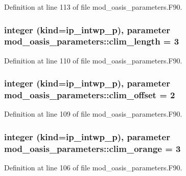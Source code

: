 Definition at line 113 of file mod\+\_\+oasis\+\_\+parameters.\+F90.

\hypertarget{classmod__oasis__parameters_a984896e821cbbb8c4a91e86ff19d54de}{
\subsubsection[{clim\+\_\+length}]{\setlength{\rightskip}{0pt plus 5cm}integer (kind=ip\+\_\+intwp\+\_\+p), parameter mod\+\_\+oasis\+\_\+parameters\+::clim\+\_\+length = 3}}\label{classmod__oasis__parameters_a984896e821cbbb8c4a91e86ff19d54de}


Definition at line 110 of file mod\+\_\+oasis\+\_\+parameters.\+F90.

\hypertarget{classmod__oasis__parameters_a4cd07733eaf5d8c8148986c0c4217772}{
\subsubsection[{clim\+\_\+offset}]{\setlength{\rightskip}{0pt plus 5cm}integer (kind=ip\+\_\+intwp\+\_\+p), parameter mod\+\_\+oasis\+\_\+parameters\+::clim\+\_\+offset = 2}}\label{classmod__oasis__parameters_a4cd07733eaf5d8c8148986c0c4217772}


Definition at line 109 of file mod\+\_\+oasis\+\_\+parameters.\+F90.

\hypertarget{classmod__oasis__parameters_a17c74cc8141b595e448588b1add0f6bf}{
\subsubsection[{clim\+\_\+orange}]{\setlength{\rightskip}{0pt plus 5cm}integer (kind=ip\+\_\+intwp\+\_\+p), parameter mod\+\_\+oasis\+\_\+parameters\+::clim\+\_\+orange = 3}}\label{classmod__oasis__parameters_a17c74cc8141b595e448588b1add0f6bf}


Definition at line 106 of file mod\+\_\+oasis\+\_\+parameters.\+F90.

